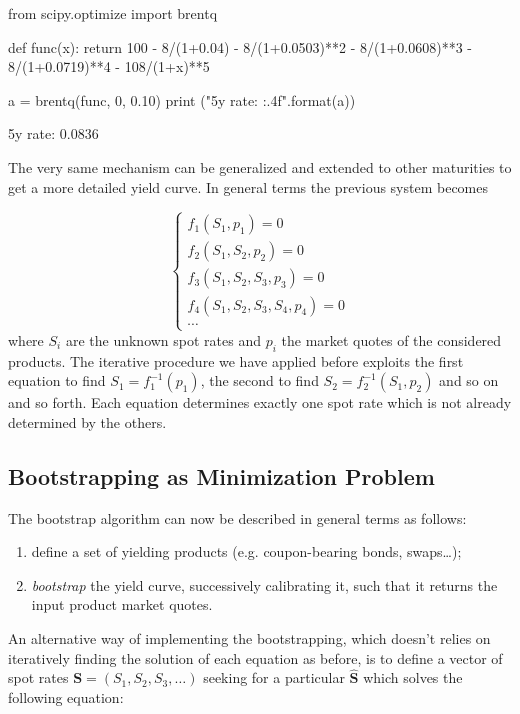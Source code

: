 \begin{ipython}
from scipy.optimize import brentq

def func(x):
    return 100 - 8/(1+0.04) - 8/(1+0.0503)**2 - 8/(1+0.0608)**3
               - 8/(1+0.0719)**4 - 108/(1+x)**5
               
a = brentq(func, 0, 0.10)
print ("5y rate: {:.4f}".format(a))
\end{ipython}
\begin{ioutput}
5y rate: 0.0836
\end{ioutput}

The very same mechanism can be generalized and extended to other maturities to get a more detailed yield curve. In general terms the previous system becomes

\begin{equation}
\begin{cases}
f_1(S_1, p_1) = 0 \\
f_2(S_1, S_2, p_2) = 0 \\
f_3(S_1, S_2, S_3, p_3) = 0 \\
f_4(S_1, S_2, S_3, S_4, p_4) = 0 \\
\cdots
\end{cases}
\end{equation}
where $S_i$ are the unknown spot rates and $p_i$ the market quotes of the considered products. The iterative procedure we have applied before exploits the first equation to find $S_1 = f_1^{-1}(p_1)$, the second to find $S_2 = f_2^{-1}(S_1, p_2)$ and so on and so forth. Each equation determines exactly one spot rate which is not already determined by the others.

\subsection{Bootstrapping as Minimization Problem}
\label{sec:bootstrap_as_minimization}
The bootstrap algorithm can now be described in general terms as follows:
\begin{enumerate}
\item define a set of yielding products (e.g. coupon-bearing bonds, swaps\ldots);
\item \emph{bootstrap} the yield curve, successively calibrating it, such that it returns the input product market quotes.
\end{enumerate}

An alternative way of implementing the bootstrapping, which doesn't relies on  iteratively finding the solution of each equation as before, is to define a vector of spot rates $\mathbf{S} = (S_1, S_2, S_3, \ldots)$ seeking for a particular $\mathbf{\hat{S}}$ which solves the following equation:

